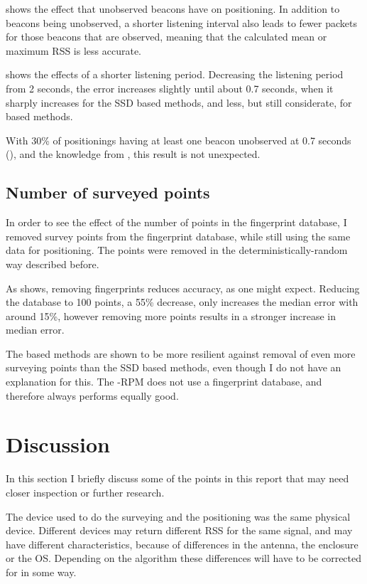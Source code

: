  shows the effect that unobserved beacons have on positioning.
In addition to beacons being unobserved, a shorter listening interval also leads to fewer packets for those beacons that are observed, meaning that the calculated mean or maximum RSS is less accurate.

 shows the effects of a shorter listening period.
Decreasing the listening period from 2 seconds, the error increases slightly until about 0.7 seconds, when it sharply increases for the SSD based methods, and less, but still considerate, for \aBRP based methods.

With 30\% of positionings having at least one beacon unobserved at 0.7 seconds (), and the knowledge from , this result is not unexpected.

\subsection{Number of surveyed points}
\label{sec:architecture-number-surveyed-points}
In order to see the effect of the number of points in the fingerprint database, I removed survey points from the fingerprint database, while still using the same data for positioning.
The points were removed in the deterministically-random way described before.

As  shows, removing fingerprints reduces accuracy, as one might expect.
Reducing the database to 100 points, a 55\% decrease, only increases the median error with around 15\%, however removing more points results in a stronger increase in median error.

The \aBRP based methods are shown to be more resilient against removal of even more surveying points than the SSD based methods, even though I do not have an explanation for this.
The \aBRP-RPM does not use a fingerprint database, and therefore always performs equally good.

\section{Discussion}
In this section I briefly discuss some of the points in this report that may need closer inspection or further research.

The device used to do the surveying and the positioning was the same physical device.
Different devices may return different RSS for the same signal, and may have different characteristics, because of differences in the antenna, the enclosure or the OS.
Depending on the algorithm these differences will have to be corrected for in some way.

